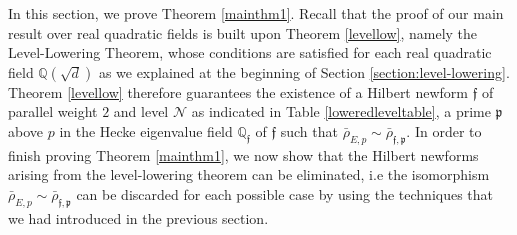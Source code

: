 \documentclass[]{article}
\newcommand {\QQ}{{\mathbb{Q}}}
\begin{document}
In this section, we prove Theorem \ref{mainthm1}. Recall that the proof of our main result over real quadratic fields is built upon Theorem \ref{levellow}, namely the Level-Lowering Theorem, whose conditions are satisfied for each real quadratic field $\QQ(\sqrt{d})$ as we explained at the beginning of Section \ref{section:level-lowering}. Theorem \ref{levellow} therefore guarantees the existence of a Hilbert newform $\mathfrak{f}$ of parallel weight $2$ and level $\mathcal{N}$ as indicated in Table \ref{loweredleveltable}, a prime $\mathfrak{p}$ above $p$ in the Hecke eigenvalue field $\QQ_{\mathfrak{f}}$ of $\mathfrak{f}$ such that $\bar{\rho}_{E, p} \sim \bar{\rho}_{\mathfrak{f}, \mathfrak{p}}$. In order to finish proving Theorem \ref{mainthm1}, we now show that the Hilbert newforms arising from the level-lowering theorem can be eliminated, i.e the isomorphism $\bar{\rho}_{E, p} \sim \bar{\rho}_{\mathfrak{f}, \mathfrak{p}}$ can be discarded for each possible case by using the techniques that we had introduced in the previous section.
\end{document}

